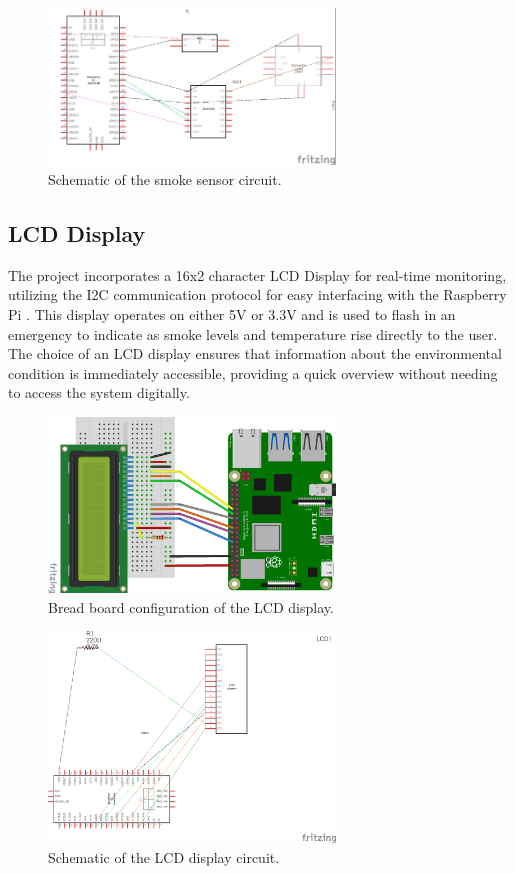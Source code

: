 \begin{figure}[H]
    \centering
    \includegraphics[width=3in]{../assets/MQ2SensorSchematic.png}
    \caption{Schematic of the smoke sensor circuit.}
\end{figure}

\subsection{LCD Display}

The project incorporates a 16x2 character LCD Display for real-time monitoring, utilizing the I2C communication
protocol for easy interfacing with the Raspberry Pi . This display operates on either 5V or 3.3V and is used to flash
in an emergency to indicate as smoke levels and temperature rise directly to the user. The choice of an LCD display
ensures that information about the environmental condition is immediately accessible, providing a quick overview
without needing to access the system digitally.

\begin{figure}[H]
    \centering
    \includegraphics[width=3in]{../assets/LCDBB.png}
    \caption{Bread board configuration of the LCD display.}
\end{figure}

\begin{figure}[H]
    \centering
    \includegraphics[width=3in]{../assets/LCDSchema.png}
    \caption{Schematic of the LCD display circuit.}
\end{figure}

